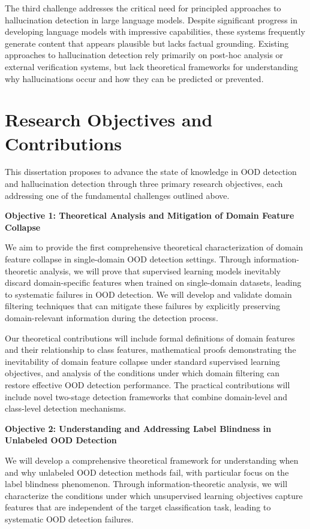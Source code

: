 \documentclass[11pt, oneside]{book}
\theoremstyle{plain}
\theoremstyle{definition}
\theoremstyle{remark}
\begin{document}
The third challenge addresses the critical need for principled approaches to hallucination detection in large language models. Despite significant progress in developing language models with impressive capabilities, these systems frequently generate content that appears plausible but lacks factual grounding. Existing approaches to hallucination detection rely primarily on post-hoc analysis or external verification systems, but lack theoretical frameworks for understanding why hallucinations occur and how they can be predicted or prevented.

\section{Research Objectives and Contributions}

This dissertation proposes to advance the state of knowledge in OOD detection and hallucination detection through three primary research objectives, each addressing one of the fundamental challenges outlined above.

\textbf{Objective 1: Theoretical Analysis and Mitigation of Domain Feature Collapse}

We aim to provide the first comprehensive theoretical characterization of domain feature collapse in single-domain OOD detection settings. Through information-theoretic analysis, we will prove that supervised learning models inevitably discard domain-specific features when trained on single-domain datasets, leading to systematic failures in OOD detection. We will develop and validate domain filtering techniques that can mitigate these failures by explicitly preserving domain-relevant information during the detection process.

Our theoretical contributions will include formal definitions of domain features and their relationship to class features, mathematical proofs demonstrating the inevitability of domain feature collapse under standard supervised learning objectives, and analysis of the conditions under which domain filtering can restore effective OOD detection performance. The practical contributions will include novel two-stage detection frameworks that combine domain-level and class-level detection mechanisms.

\textbf{Objective 2: Understanding and Addressing Label Blindness in Unlabeled OOD Detection}

We will develop a comprehensive theoretical framework for understanding when and why unlabeled OOD detection methods fail, with particular focus on the label blindness phenomenon. Through information-theoretic analysis, we will characterize the conditions under which unsupervised learning objectives capture features that are independent of the target classification task, leading to systematic OOD detection failures.
\end{document}
